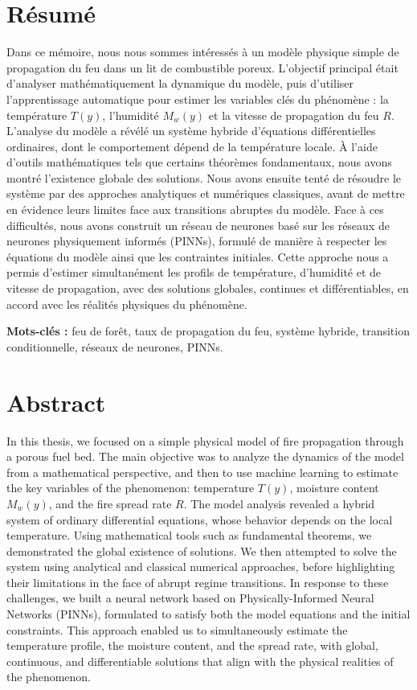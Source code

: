 \documentclass[12pt, oneside]{report} %
\theoremstyle{definition}
\theoremstyle{remark}
\begin{document}
	\chapter*{Résumé}
Dans ce mémoire, nous nous sommes intéressés à un modèle physique simple de propagation du feu dans un lit de combustible poreux.  
L’objectif principal était d’analyser mathématiquement la dynamique du modèle, puis d’utiliser l’apprentissage automatique pour estimer les variables clés du phénomène : la température $T(y)$, l’humidité $M_w(y)$ et la vitesse de propagation du feu $R$.
L’analyse du modèle a révélé un système hybride d’équations différentielles ordinaires, dont le comportement dépend de la température locale.  
À l’aide d’outils mathématiques tels que certains théorèmes fondamentaux, nous avons montré l’existence globale des solutions.  
Nous avons ensuite tenté de résoudre le système par des approches analytiques et numériques classiques, avant de mettre en évidence leurs limites face aux transitions abruptes du modèle.
Face à ces difficultés, nous avons construit un réseau de neurones basé sur les réseaux de neurones physiquement informés (PINNs), formulé de manière à respecter les équations du modèle ainsi que les contraintes initiales.  
Cette approche nous a permis d’estimer simultanément les profils de température, d’humidité et de vitesse de propagation, avec des solutions globales, continues et différentiables, en accord avec les réalités physiques du phénomène.

\vspace{0.3cm}

\textbf{Mots-clés :} feu de forêt, taux de propagation du feu, système hybride, transition conditionnelle, réseaux de neurones, PINNs.

	
	\chapter*{Abstract}
	In this thesis, we focused on a simple physical model of fire propagation through a porous fuel bed.  
	The main objective was to analyze the dynamics of the model from a mathematical perspective, and then to use machine learning to estimate the key variables of the phenomenon: temperature $T(y)$, moisture content $M_w(y)$, and the fire spread rate $R$.
	The model analysis revealed a hybrid system of ordinary differential equations, whose behavior depends on the local temperature.  
	Using mathematical tools such as fundamental theorems, we demonstrated the global existence of solutions.  
	We then attempted to solve the system using analytical and classical numerical approaches, before highlighting their limitations in the face of abrupt regime transitions.
	In response to these challenges, we built a neural network based on Physically-Informed Neural Networks (PINNs), formulated to satisfy both the model equations and the initial constraints.  
	This approach enabled us to simultaneously estimate the temperature profile, the moisture content, and the spread rate, with global, continuous, and differentiable solutions that align with the physical realities of the phenomenon.
	
\end{document}
